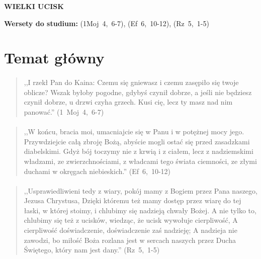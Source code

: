 \documentclass[10pt,a4paper,oneside]{article}
\begin{document}
\centerline{\textbf{\MakeUppercase{Wielki ucisk}}}
\begin{center}
\textbf{Wersety do studium:} \mbox{(1Moj 4, 6-7)}, \mbox{(Ef 6, 10-12)}, \mbox{(Rz 5, 1-5)}
\end{center}
\section{Temat główny}
\paragraph{}
\begin{quote}
,,I rzekł Pan do Kaina: Czemu się gniewasz i czemu zasępiło się twoje oblicze? Wszak byłoby pogodne, gdybyś czynił dobrze, a jeśli nie będziesz czynił dobrze, u drzwi czyha grzech. Kusi cię, lecz ty masz nad nim panować.'' \mbox{(1 Moj 4, 6-7)}
\end{quote}
\paragraph{}
\begin{quote}
,,W końcu, bracia moi, umacniajcie się w Panu i w potężnej mocy jego. Przywdziejcie całą zbroję Bożą, abyście mogli ostać się przed zasadzkami diabelskimi. Gdyż bój toczymy nie z krwią i z ciałem, lecz z nadziemskimi władzami, ze zwierzchnościami, z władcami tego świata ciemności, ze złymi duchami w okręgach niebieskich.'' \mbox{(Ef 6, 10-12)}
\end{quote}
\paragraph{}
\begin{quote}
,,Usprawiedliwieni tedy z wiary, pokój mamy z Bogiem przez Pana naszego, Jezusa Chrystusa, Dzięki któremu też mamy dostęp przez wiarę do tej łaski, w której stoimy, i chlubimy się nadzieją chwały Bożej. A nie tylko to, chlubimy się też z ucisków, wiedząc, że ucisk wywołuje cierpliwość, A cierpliwość doświadczenie, doświadczenie zaś nadzieję; A nadzieja nie zawodzi, bo miłość Boża rozlana jest w sercach naszych przez Ducha Świętego, który nam jest dany.'' \mbox{(Rz 5, 1-5)}
\end{quote}
\end{document}
